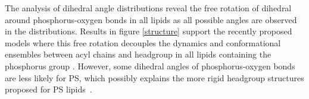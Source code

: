 \documentclass[aps,prl,superscriptaddress,twocolumn]{revtex4}
\begin{document}
%
%
%
%
%
%

The analysis of dihedral angle distributions reveal the free rotation of dihedral around
phosphorus-oxygen bonds in all lipids as all possible angles are observed in the distributions.
Results in figure \ref{structure} support the recently proposed models where this free rotation 
decouples the dynamics and conformational ensembles between acyl chains and headgroup in all lipids containing
the phosphorus group \cite{antila21}. 
However, some dihedral angles of phosphorus-oxygen bonds are less likely for PS, which
possibly explains the more rigid headgroup structures proposed for PS lipids~\cite{browning80,buldt81}.

\end{document}
